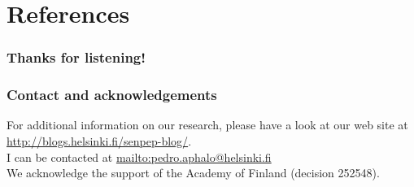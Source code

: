 \documentclass[utf8]{beamer}\usepackage[]{graphicx}\usepackage[]{color} %
\begin{document}
\section{References}

\begin{frame}[<+->]
\frametitle{Thanks for listening!}
\begin{center}
\end{center}
\end{frame}

\begin{frame}[<+->]
\frametitle{Contact and acknowledgements}
For additional information on our research, please have a look at our web site at \url{http://blogs.helsinki.fi/senpep-blog/}.\\[2ex]

I can be contacted at \url{mailto:pedro.aphalo@helsinki.fi}\\[2ex]

We acknowledge the support of the Academy of Finland (decision 252548).

\begin{center}

\end{center}
\end{frame}
\end{document}

